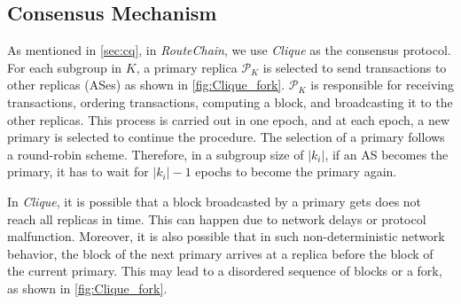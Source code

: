 \documentclass[conference]{IEEEtran}
\newcommand{\rc}{{{\em RouteChain}}\xspace}
\newcommand{\eg}{{\em e.g.}\xspace}
\begin{document}

\subsection{Consensus Mechanism}\label{sec:consen}
As mentioned in \textsection\ref{sec:cq}, in \rc, we use {\em Clique} as the consensus protocol. For each subgroup in $K$, a primary replica $\mathcal{P}_{K}$ is selected to send transactions to other replicas (ASes) as shown in \autoref{fig:Clique_fork}. $\mathcal{P}_{K}$ is responsible for receiving transactions, ordering transactions, computing a block, and broadcasting it to the other replicas. This process is carried out in one epoch, and at each epoch, a new primary is selected to continue the procedure. The selection of a primary follows a round-robin scheme. Therefore, in a subgroup size of $|k_{i}|$, if an AS becomes the primary, it has to wait for $|k_{i}|-1$ epochs to become the primary again.  


In {\em Clique}, it is possible that a block broadcasted by a primary gets does not reach all replicas in time. This can happen due to network delays or protocol malfunction. Moreover, it is also possible that in such non-deterministic network behavior, the block of the next primary arrives at a replica before the block of the current primary. This may lead to a disordered sequence of blocks or a fork, as shown in \autoref{fig:Clique_fork}. 
\end{document}
